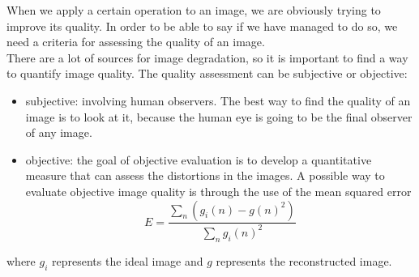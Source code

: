 When we apply a certain operation to an image, we are obviously trying to improve its quality. In order to be able to say if we have managed to do so, we need a criteria for assessing the quality of an image. \\ 
There are a lot of sources for image degradation, so it is important to find a way to quantify image quality. The quality assessment can be subjective or objective:
\begin{itemize}
	\item subjective: involving human observers. The best way to find the quality of an image is to look at it, because the human eye is going to be the final observer of any image.
	\item objective: the goal of objective evaluation is to develop a quantitative measure that can assess the distortions in the images. A possible way to evaluate objective image quality is through the use of the mean squared error
	$$
		E = \frac{\sum_n (g_i(n)-g(n)^2)}{\sum_n g_i(n)^2}
	$$
\end{itemize}
where $g_i$ represents the ideal image and $g$ represents the reconstructed image.

